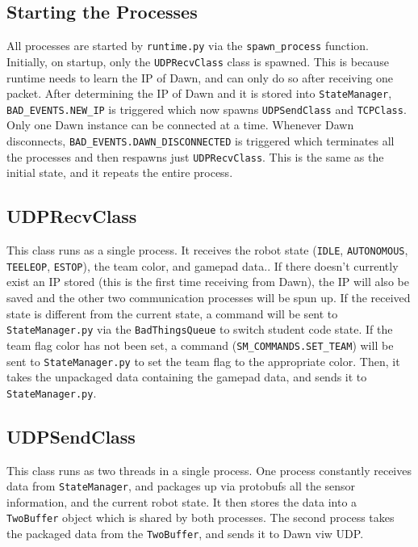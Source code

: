 \documentclass[12pt]{book}
\begin{document}
\subsection{Starting the Processes}\label{starting-the-processes}

All processes are started by \texttt{runtime.py} via the
\texttt{spawn\_process} function. Initially, on startup, only the
\texttt{UDPRecvClass} class is spawned. This is because runtime needs to
learn the IP of Dawn, and can only do so after receiving one packet.
After determining the IP of Dawn and it is stored into
\texttt{StateManager}, \texttt{BAD\_EVENTS.NEW\_IP} is triggered which
now spawns \texttt{UDPSendClass} and \texttt{TCPClass}. Only one Dawn
instance can be connected at a time. Whenever Dawn disconnects,
\texttt{BAD\_EVENTS.DAWN\_DISCONNECTED} is triggered which terminates
all the processes and then respawns just \texttt{UDPRecvClass}. This is
the same as the initial state, and it repeats the entire process.

\subsection{UDPRecvClass}\label{udprecvclass}

This class runs as a single process. It receives the robot state
(\texttt{IDLE}, \texttt{AUTONOMOUS}, \texttt{TEELEOP}, \texttt{ESTOP}),
the team color, and gamepad data.. If there doesn't currently exist an
IP stored (this is the first time receiving from Dawn), the IP will also
be saved and the other two communication processes will be spun up. If
the received state is different from the current state, a command will
be sent to \texttt{StateManager.py} via the \texttt{BadThingsQueue} to
switch student code state. If the team flag color has not been set, a
command (\texttt{SM\_COMMANDS.SET\_TEAM}) will be sent to
\texttt{StateManager.py} to set the team flag to the appropriate color.
Then, it takes the unpackaged data containing the gamepad data, and
sends it to \texttt{StateManager.py}.

\subsection{UDPSendClass}\label{udpsendclass}

This class runs as two threads in a single process. One process
constantly receives data from \texttt{StateManager}, and packages up via
protobufs all the sensor information, and the current robot state. It
then stores the data into a\\
\texttt{TwoBuffer} object which is shared by both processes. The second
process takes the packaged data from the \texttt{TwoBuffer}, and sends
it to Dawn viw UDP.
\end{document}
